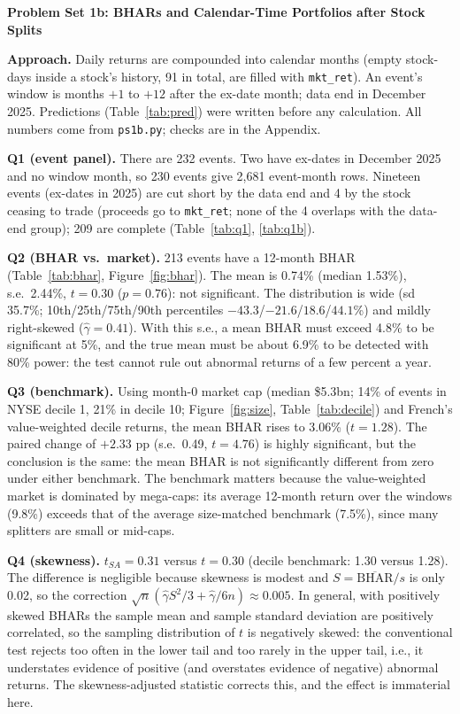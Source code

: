 \documentclass[10pt]{article}
\begin{document}
\noindent\textbf{Problem Set 1b: BHARs and Calendar-Time Portfolios after Stock Splits}

\medskip
\noindent\textbf{Approach.} Daily returns are compounded into calendar months (empty stock-days inside a stock's history, 91 in total, are filled with \texttt{mkt\_ret}). An event's window is months $+1$ to $+12$ after the ex-date month; data end in December 2025. Predictions (Table~\ref{tab:pred}) were written before any calculation. All numbers come from \texttt{ps1b.py}; checks are in the Appendix.

\medskip
\noindent\textbf{Q1 (event panel).} There are 232 events. Two have ex-dates in December 2025 and no window month, so 230 events give 2,681 event-month rows. Nineteen events (ex-dates in 2025) are cut short by the data end and 4 by the stock ceasing to trade (proceeds go to \texttt{mkt\_ret}; none of the 4 overlaps with the data-end group); 209 are complete (Table~\ref{tab:q1}, \ref{tab:q1b}).

\medskip
\noindent\textbf{Q2 (BHAR vs.\ market).} 213 events have a 12-month BHAR (Table~\ref{tab:bhar}, Figure~\ref{fig:bhar}). The mean is 0.74\% (median 1.53\%), s.e.\ 2.44\%, $t=0.30$ ($p=0.76$): not significant. The distribution is wide (sd 35.7\%; 10th/25th/75th/90th percentiles $-43.3$/$-21.6$/$18.6$/$44.1$\%) and mildly right-skewed ($\hat\gamma=0.41$). With this s.e., a mean BHAR must exceed 4.8\% to be significant at 5\%, and the true mean must be about 6.9\% to be detected with 80\% power: the test cannot rule out abnormal returns of a few percent a year.

\medskip
\noindent\textbf{Q3 (benchmark).} Using month-0 market cap (median \$5.3bn; 14\% of events in NYSE decile 1, 21\% in decile 10; Figure~\ref{fig:size}, Table~\ref{tab:decile}) and French's value-weighted decile returns, the mean BHAR rises to 3.06\% ($t=1.28$). The paired change of $+2.33$ pp (s.e.\ 0.49, $t=4.76$) is highly significant, but the conclusion is the same: the mean BHAR is not significantly different from zero under either benchmark. The benchmark matters because the value-weighted market is dominated by mega-caps: its average 12-month return over the windows (9.8\%) exceeds that of the average size-matched benchmark (7.5\%), since many splitters are small or mid-caps.

\medskip
\noindent\textbf{Q4 (skewness).} $t_{SA}=0.31$ versus $t=0.30$ (decile benchmark: 1.30 versus 1.28). The difference is negligible because skewness is modest and $S=\overline{\mathrm{BHAR}}/s$ is only 0.02, so the correction $\sqrt n(\hat\gamma S^2/3+\hat\gamma/6n)\approx 0.005$. In general, with positively skewed BHARs the sample mean and sample standard deviation are positively correlated, so the sampling distribution of $t$ is negatively skewed: the conventional test rejects too often in the lower tail and too rarely in the upper tail, i.e., it understates evidence of positive (and overstates evidence of negative) abnormal returns. The skewness-adjusted statistic corrects this, and the effect is immaterial here.
\end{document}
